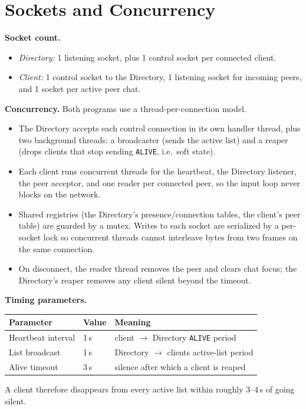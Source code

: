 \documentclass[11pt]{article}
\begin{document}
\section{Sockets and Concurrency}
\textbf{Socket count.}
\begin{itemize}
  \item \emph{Directory:} 1 listening socket, plus 1 control socket per connected client.
  \item \emph{Client:} 1 control socket to the Directory, 1 listening socket for
        incoming peers, and 1 socket per active peer chat.
\end{itemize}

\textbf{Concurrency.} Both programs use a thread-per-connection model.
\begin{itemize}
  \item The Directory accepts each control connection in its own handler thread,
        plus two background threads: a broadcaster (sends the active list) and a
        reaper (drops clients that stop sending \texttt{ALIVE}, i.e.\ soft state).
  \item Each client runs concurrent threads for the heartbeat, the Directory
        listener, the peer acceptor, and one reader per connected peer, so the
        input loop never blocks on the network.
  \item Shared registries (the Directory's presence/connection tables, the
        client's peer table) are guarded by a mutex. Writes to each socket are
        serialized by a per-socket lock so concurrent threads cannot interleave
        bytes from two frames on the same connection.
  \item On disconnect, the reader thread removes the peer and clears chat focus;
        the Directory's reaper removes any client silent beyond the timeout.
\end{itemize}

\textbf{Timing parameters.}

\begin{center}
\begin{tabular}{@{}lll@{}}
\toprule
\textbf{Parameter} & \textbf{Value} & \textbf{Meaning} \\
\midrule
Heartbeat interval & 1\,s & client $\to$ Directory \texttt{ALIVE} period \\
List broadcast     & 1\,s & Directory $\to$ clients active-list period \\
Alive timeout      & 3\,s & silence after which a client is reaped \\
\bottomrule
\end{tabular}
\end{center}
\noindent A client therefore disappears from every active list within roughly
3--4\,s of going silent.
\end{document}
